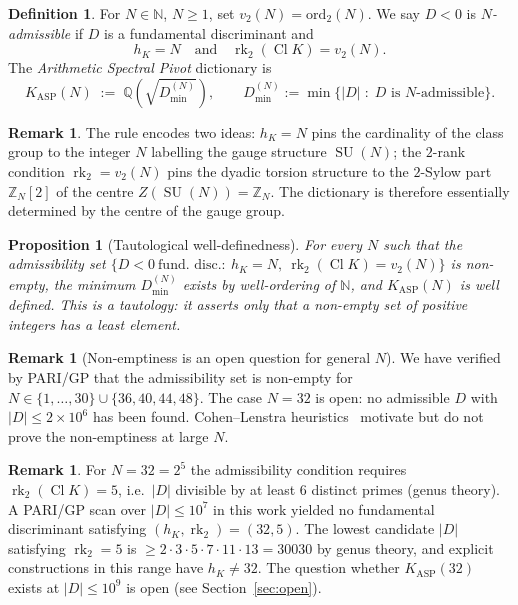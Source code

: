 \documentclass[11pt,a4paper]{article}
\newtheorem{proposition}[theorem]{Proposition}
\theoremstyle{definition}
\newtheorem{definition}[theorem]{Definition}
\newtheorem{remark}[theorem]{Remark}
\DeclareMathOperator{\Cl}{Cl}
\DeclareMathOperator{\rk}{rk}
\DeclareMathOperator{\SU}{SU}
\newcommand{\KASP}{K_{\mathrm{ASP}}}
\newcommand{\NN}{\mathbb{N}}
\newcommand{\ZZ}{\mathbb{Z}}
\newcommand{\QQ}{\mathbb{Q}}
\begin{document}
\begin{definition}\label{def:KASP}
For $N \in \NN$, $N \geq 1$, set $v_2(N) = \mathrm{ord}_2(N)$. We say $D < 0$ is
\emph{$N$-admissible} if $D$ is a fundamental discriminant and
\[
  h_K = N \quad\text{and}\quad \rk_2(\Cl K) = v_2(N).
\]
The \emph{Arithmetic Spectral Pivot} dictionary is
\[
  \KASP(N) \;:=\; \QQ\!\left(\sqrt{D_{\min}^{(N)}}\right),
  \qquad D_{\min}^{(N)} := \min\{|D|\;:\; D \text{ is $N$-admissible}\}.
\]
\end{definition}

\begin{remark}
The rule encodes two ideas: $h_K = N$ pins the cardinality of the class group
to the integer $N$ labelling the gauge structure $\SU(N)$; the $2$-rank
condition $\rk_2 = v_2(N)$ pins the dyadic torsion structure to the
$2$-Sylow part $\ZZ_N[2]$ of the centre $Z(\SU(N)) = \ZZ_N$. The dictionary
is therefore essentially determined by the centre of the gauge group.
\end{remark}

\begin{proposition}[Tautological well-definedness]\label{prop:exist}
For every $N$ such that the admissibility set
$\{D < 0\ \text{fund. disc.}:\ h_K = N,\ \rk_2(\Cl K) = v_2(N)\}$ is non-empty,
the minimum $D_{\min}^{(N)}$ exists by well-ordering of $\NN$, and $\KASP(N)$
is well defined. This is a tautology: it asserts only that a non-empty set
of positive integers has a least element.
\end{proposition}

\begin{remark}[Non-emptiness is an open question for general $N$]\label{rem:nonempty}
We have verified by PARI/GP that the admissibility set is non-empty for
$N\in\{1,\dots,30\}\cup\{36,40,44,48\}$. The case $N=32$ is open: no
admissible $D$ with $|D|\leq 2\times 10^6$ has been found. Cohen--Lenstra
heuristics~\cite{CohenLenstra1984} motivate but do not prove the
non-emptiness at large $N$.
\end{remark}

\begin{remark}\label{rem:N32}
For $N = 32 = 2^5$ the admissibility condition requires
$\rk_2(\Cl K) = 5$, i.e.\ $|D|$ divisible by at least $6$ distinct primes
(genus theory). A PARI/GP scan over $|D| \leq 10^7$ in this work yielded
no fundamental discriminant satisfying $(h_K, \rk_2) = (32, 5)$. The lowest
candidate $|D|$ satisfying $\rk_2 = 5$ is $\geq 2\cdot 3\cdot 5 \cdot 7\cdot 11
\cdot 13 = 30030$ by genus theory, and explicit constructions in this
range have $h_K \neq 32$. The question whether $\KASP(32)$ exists at
$|D| \leq 10^9$ is open (see Section~\ref{sec:open}).
\end{remark}
\end{document}
